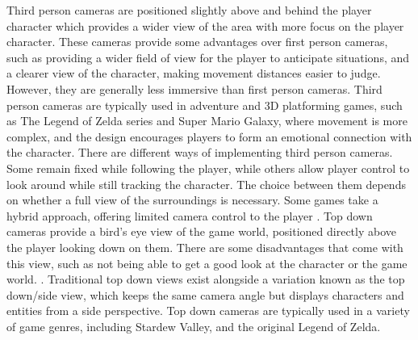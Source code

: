 \documentclass[10pt]{final_report}
\begin{document}
\newline 
Third person cameras are positioned slightly above and behind the player character which provides a wider view of the area with more focus on the player character. These cameras provide some advantages over first person cameras, such as providing a wider field of view for the player to anticipate situations, and a clearer view of the character, making movement distances easier to judge. However, they are generally less immersive than first person cameras. Third person cameras are typically used in adventure and 3D platforming games, such as The Legend of Zelda series and Super Mario Galaxy, where movement is more complex, and the design encourages players to form an emotional connection with the character. There are different ways of implementing third person cameras. Some remain fixed while following the player, while others allow player control to look around while still tracking the character. The choice between them depends on whether a full view of the surroundings is necessary. Some games take a hybrid approach, offering limited camera control to the player \cite{Hutchinson2009}.
\newline
Top down cameras provide a bird's eye view of the game world, positioned directly above the player looking down on them. There are some disadvantages that come with this view, such as not being able to get a good look at the character or the game world. \cite{Rogers2014}. Traditional top down views exist alongside a variation known as the top down/side view, which keeps the same camera angle but displays characters and entities from a side perspective. Top down cameras are typically used in a variety of game genres, including Stardew Valley, and the original Legend of Zelda.
\end{document}
